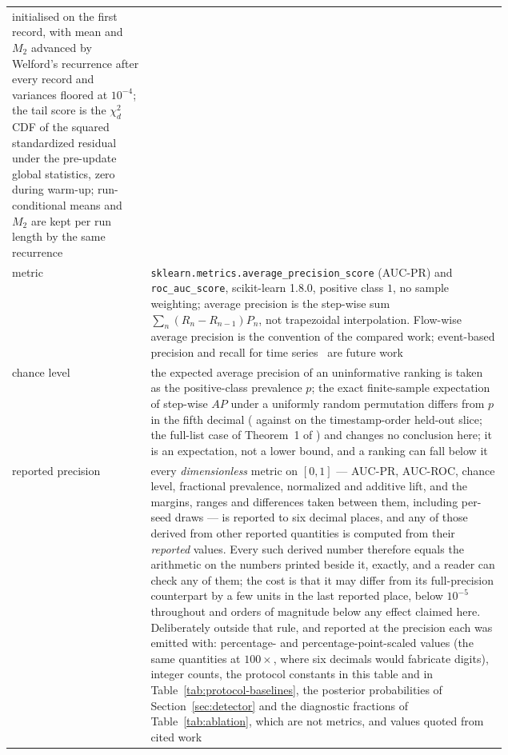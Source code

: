 \documentclass[manuscript,screen,nonacm]{acmart}
\begin{document}
\begin{table}
\begin{tabular}{@{}lp{0.72\linewidth}@{}}
initialised on the first record, with mean and $M_2$ advanced by Welford's
recurrence after every record and variances floored at $10^{-4}$; the tail
score is the $\chi^2_d$ CDF of the squared standardized residual under the
pre-update global statistics, zero during warm-up; run-conditional means and
$M_2$ are kept per run length by the same recurrence \\
metric & \texttt{sklearn.metrics.average\_precision\_score} (AUC-PR) and
\texttt{roc\_auc\_score}, scikit-learn 1.8.0, positive class $1$, no sample
weighting; average precision is the step-wise sum
$\sum_n (R_n-R_{n-1})P_n$, not trapezoidal interpolation. Flow-wise average
precision is the convention of the compared work; event-based precision and
recall for time series~\citep{tatbul2018precision} are future work \\
chance level & the expected average precision of an uninformative ranking is
taken as the positive-class prevalence $p$; the exact finite-sample expectation
of step-wise $AP$ under a uniformly random permutation differs from $p$ in the
fifth decimal (\ChanceExactNaturalSliceAucpr{} against
\SFourCicidsNaturalChanceFloor{} on the timestamp-order held-out slice; the
full-list case of Theorem~1 of \citet{manzhos2026ap}) and
changes no conclusion here; it is an expectation, not a lower bound, and a
ranking can fall below it \\
reported precision & every \emph{dimensionless} metric on $[0,1]$ ---
AUC-PR, AUC-ROC, chance level, fractional prevalence, normalized and additive
lift, and the margins, ranges and differences taken between them, including
per-seed draws --- is reported to six decimal places, and any of those derived
from other reported quantities is computed from their \emph{reported} values.
Every such derived number therefore equals the arithmetic on the numbers
printed beside it, exactly, and a reader can check any of them; the cost is
that it may differ from its full-precision counterpart by a few units in the
last reported place, below $10^{-5}$ throughout and orders of magnitude below
any effect claimed here. Deliberately outside that rule, and reported at the
precision each was emitted with: percentage- and percentage-point-scaled
values (the same quantities at $100\times$, where six decimals would fabricate
digits), integer counts, the protocol constants in this table and in
Table~\ref{tab:protocol-baselines}, the posterior
probabilities of Section~\ref{sec:detector} and the diagnostic fractions of
Table~\ref{tab:ablation}, which are not metrics, and values quoted from cited
work \\
\bottomrule
\end{tabular}
\end{table}
\end{document}
